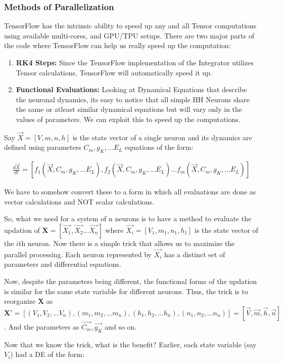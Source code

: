 \documentclass[10pt,letterpaper]{article}
\begin{document}
\subsubsection*{Methods of Parallelization}
TensorFlow has the intrinsic ability to speed up any and all Tensor computations using available multi-cores, and GPU/TPU setups. There are two major parts of the code where TensorFlow can help us really speed up the computation:
\begin{enumerate}
\item \textbf{RK4 Steps:} Since the TensorFlow implementation of the Integrator utilizes Tensor calculations, TensorFlow will automatically speed it up.
\item \textbf{Functional Evaluations:} Looking at Dynamical Equations that describe the neuronal dynamics, its easy to notice that all simple HH Neurons share the same or atleast similar dynamical equations but will vary only in the values of parameters. We can exploit this to speed up the computations.
\end{enumerate}

Say $\vec{X}=[V,m,n,h]$ is the state vector of a single neuron and its dynamics are defined using parameters $C_m,g_K,...E_L$ equations of the form: 

\begin{eqnarray}\frac{d\vec{X}}{dt} = [f_1(\vec{X},C_m,g_K,...E_L),f_2(\vec{X},C_m,g_K,...E_L)...f_m(\vec{X},C_m,g_K,...E_L)]\end{eqnarray}

We have to somehow convert these to a form in which all evaluations are done as vector calculations and NOT scalar calculations.

So, what we need for a system of n neurons is to have a method to evaluate the updation of $\mathbf{X}=[\vec{X_1},\vec{X_2}...\vec{X_n}]$ where $\vec{X_i}=[V_1,m_1,n_1,h_1]$ is the state vector of the $i$th neuron. Now there is a simple trick that allows us to maximize the parallel processing. Each neuron represented by $\vec{X_i}$ has a distinct set of parameters and differential equations.

Now, despite the parameters being different, the functional forms of the updation is similar for the same state variable for different neurons. Thus, the trick is to reorganize $\mathbf{X}$ as $\mathbf{X'}=[(V_1,V_2,...V_n),(m_1,m_2,...m_n),(h_1,h_2,...h_n),(n_1,n_2,...n_n)]=[\vec{V},\vec{m},\vec{h},\vec{n}]$. And the parameters as $\vec{C_m},\vec{g_K}$ and so on.

Now that we know the trick, what is the benefit? Earlier, each state variable (say $V_i$) had a DE of the form:
\end{document}
